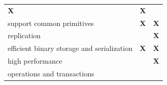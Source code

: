 \documentclass[12pt,english,a4paper,titlepage,cleardoublepage=empty,dottedtoc]{report}
\begin{document}
\begin{longtable}[]{@{}lcc@{}}
\begin{minipage}[t]{0.20\columnwidth}
\textbf{X}\strut
\end{minipage} & \begin{minipage}[t]{0.16\columnwidth}\centering\strut
\textbf{X}\strut
\end{minipage}\tabularnewline
\begin{minipage}[t]{0.37\columnwidth}\raggedright\strut
support common primitives\strut
\end{minipage} & \begin{minipage}[t]{0.20\columnwidth}\centering\strut
\textbf{X}\strut
\end{minipage} & \begin{minipage}[t]{0.16\columnwidth}\centering\strut
\textbf{X}\strut
\end{minipage}\tabularnewline
\begin{minipage}[t]{0.32\columnwidth}\raggedright\strut
replication\strut
\end{minipage} & \begin{minipage}[t]{0.32\columnwidth}\centering\strut
\strut
\end{minipage} & \begin{minipage}[t]{0.32\columnwidth}\centering\strut
\textbf{X}\strut
\end{minipage}\tabularnewline
\begin{minipage}[t]{0.37\columnwidth}\raggedright\strut
efficient binary storage and serialization\strut
\end{minipage} & \begin{minipage}[t]{0.20\columnwidth}\centering\strut
\textbf{X}\strut
\end{minipage} & \begin{minipage}[t]{0.16\columnwidth}\centering\strut
\textbf{X}\strut
\end{minipage}\tabularnewline
\begin{minipage}[t]{0.32\columnwidth}\raggedright\strut
high performance\strut
\end{minipage} & \begin{minipage}[t]{0.32\columnwidth}\centering\strut
\strut
\end{minipage} & \begin{minipage}[t]{0.32\columnwidth}\centering\strut
\textbf{X}\strut
\end{minipage}\tabularnewline
\begin{minipage}[t]{0.37\columnwidth}\raggedright\strut
operations and transactions\strut
\end{minipage} & \begin{minipage}[t]{0.20\columnwidth}\centering\strut

\end{minipage}
\end{longtable}
\end{document}
